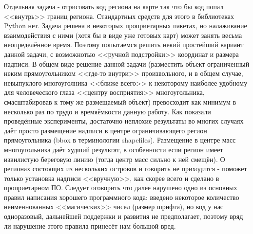 \documentclass[11pt]{article}
\begin{document}
    Отдельная задача - отрисовать код региона на карте так что бы код попал
<<внутрь>> границ региона. Стандартных средств для этого в
библиотеках Python нет. Задача решена в некоторых проприетарных пакетах,
но налаживание взаимодействия с ними (хотя бы в виде уже готовых карт)
может занять весьма неопределённое время. Поэтому попытаемся решить
некий простейший вариант данной задачи, с возможнотью
<<ручной подстройки>> координат и размера надписи. В общем виде
решение данной задачи (разместить объект ограниченный неким
прямоугольником <<где-то внутри>> произвольного, и в общем случае,
невыпуклого многоуголника <<ближе всего>> к некоторому наиболее
удобному для человеческого глаза <<центру восприятия>>
многоугольника, смасштабировав к тому же размещаемый объект) превосходит
как минимум в несколько раз по трудо и времяёмкости данную работу. Как
показали проведённые эксперименты, достаточно неплохие результаты во
многих случаях даёт просто размещение надписи в центре ограничивающего
регион прямоугольника (bbox в терминологии shapefiles). Размещение в
центре масс многоугольника даёт худший результат, в особенности если
регион имеет извилистую береговую линию (тогда центр масс сильно к ней
смещён). О регионах состоящих из нескольких островов и говорить не
приходится - поможет только установка надписи <<вручную>>, как
скорее всего и сделано в проприетарном ПО. Следует оговорить что далее
нарушено одно из основных правил написания хорошего программного кода:
введено некоторое количество неименнованных <<магических>> чисел
(размер шрифта), но код у нас одноразовый, дальнейшей поддержки и
развития не предполагает, поэтому вряд ли нарушение этого правила
принесёт нам большой вред.
\end{document}
